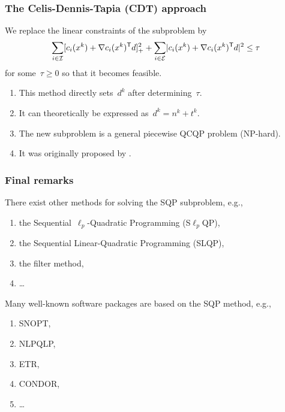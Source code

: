 \documentclass{polyu-presentation}
\newcommand{\con}[1]{c_{#1}}
\newcommand{\ieq}{\mathcal{E}}
\newcommand{\iub}{\mathcal{I}}
\begin{document}
\begin{frame}
    \frametitle{The Celis-Dennis-Tapia (CDT) approach}

    We \alert{replace} the linear constraints of the subproblem by
    \begin{equation*}
        \sum_{i \in \iub} \posp{\con{i}(x^k) + \nabla \con{i}(x^k)^{\T} d}^2 + \sum_{i \in \ieq} \abs{\con{i}(x^k) + \nabla \con{i}(x^k)^{\T} d}^2 \le \tau
    \end{equation*}
    for some~$\tau \ge 0$ so that it becomes feasible.

    \medskip

    \begin{block}{}
        \begin{enumerate}[<+(1)->]
            \item This method \alert{directly} sets~$d^k$ after determining~$\tau$.
            \item It can theoretically be \alert{expressed} as~$d^k = n^k + t^k$.
            \item The new subproblem is a general \alert{piecewise QCQP} problem (NP-hard).
            \item It was originally \alert{proposed} by \cite{Celis_1985,Celis_Dennis_Tapia_1985}.
        \end{enumerate}
    \end{block}
\end{frame}

\begin{frame}
    \frametitle{Final remarks}

    There exist \alert{other methods} for solving the SQP subproblem, e.g.,
    \begin{enumerate}
        \item the Sequential~$\ell_p$-Quadratic Programming (S$\ell_p$QP),
        \item the Sequential Linear-Quadratic Programming (SLQP),
        \item the filter method,
        \item \dots
    \end{enumerate}

    \bigskip

    Many well-known \alert{software packages} are based on the SQP method, e.g.,
    \begin{enumerate}
        \item SNOPT,
        \item NLPQLP,
        \item ETR,
        \item CONDOR,
        \item \dots
    \end{enumerate}
\end{frame}
\end{document}
